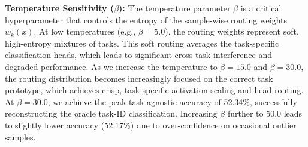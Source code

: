 \documentclass{article}
\theoremstyle{plain}
\theoremstyle{definition}
\theoremstyle{remark}
\begin{document}
\begin{table}[htbp]
\caption{Ablation studies on SRAC routing layers, temperatures ($\beta$), and clamping configurations. All models are evaluated on the multi-task test sets (MNIST, F-MNIST, CIFAR-10) and report average test accuracy (\%).}
\label{tab:ablation}
\begin{center}
\begin{small}
\end{small}
\end{center}
\end{table}

\textbf{Temperature Sensitivity ($\beta$):} 
The temperature parameter $\beta$ is a critical hyperparameter that controls the entropy of the sample-wise routing weights $w_k(x)$. At low temperatures (e.g., $\beta = 5.0$), the routing weights represent soft, high-entropy mixtures of tasks. This soft routing averages the task-specific classification heads, which leads to significant cross-task interference and degraded performance. As we increase the temperature to $\beta = 15.0$ and $\beta = 30.0$, the routing distribution becomes increasingly focused on the correct task prototype, which achieves crisp, task-specific activation scaling and head routing. At $\beta=30.0$, we achieve the peak task-agnostic accuracy of 52.34\%, successfully reconstructing the oracle task-ID classification. Increasing $\beta$ further to $50.0$ leads to slightly lower accuracy (52.17\%) due to over-confidence on occasional outlier samples.
\end{document}
